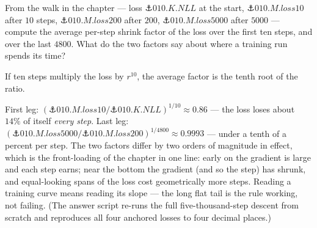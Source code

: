 \begin{problem}[stretch]
From the walk in the chapter — loss $\anchor{010.K.NLL}$ at the
start, $\anchor{010.M.loss10}$ after $10$ steps,
$\anchor{010.M.loss200}$ after $200$, $\anchor{010.M.loss5000}$
after $5000$ — compute the average per-step shrink factor of the
loss over the first ten steps, and over the last $4800$. What do the
two factors say about where a training run spends its time?
\begin{hint}
If ten steps multiply the loss by $r^{10}$, the average factor is
the tenth root of the ratio.
\end{hint}
\begin{solution}
First leg: $(\anchor{010.M.loss10} / \anchor{010.K.NLL})^{1/10}
\approx 0.86$ — the loss loses
about $14\%$ of itself \emph{every step}. Last leg:
$(\anchor{010.M.loss5000} / \anchor{010.M.loss200})^{1/4800}
\approx 0.9993$ — under a tenth of a
percent per step. The two factors differ by two orders of magnitude
in effect, which is the front-loading of the chapter in one line:
early on the gradient is large and each step earns; near the bottom
the gradient (and so the step) has shrunk, and equal-looking spans
of the loss cost geometrically more steps. Reading a training curve
means reading its slope — the long flat tail is the rule working,
not failing. (The answer script re-runs the full five-thousand-step
descent from scratch and reproduces all four anchored losses to
four decimal places.)
\end{solution}
\end{problem}
